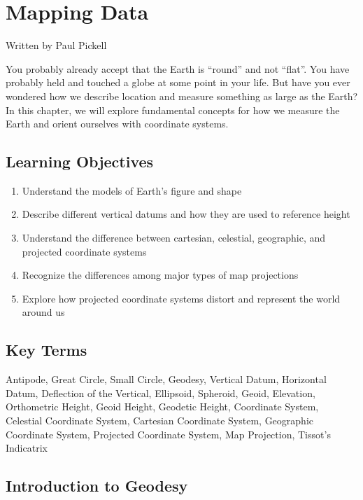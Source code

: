 \documentclass[
]{book}
\providecommand{\tightlist}{%
  \setlength{\itemsep}{0pt}\setlength{\parskip}{0pt}}
\begin{document}
\chapter{Mapping Data}\label{mapping-data}

Written by
Paul Pickell

You probably already accept that the Earth is ``round'' and not ``flat''. You have probably held and touched a globe at some point in your life. But have you ever wondered how we describe location and measure something as large as the Earth? In this chapter, we will explore fundamental concepts for how we measure the Earth and orient ourselves with coordinate systems.

\section*{Learning Objectives}\label{learning-objectives-1}

\begin{enumerate}
\def\labelenumi{\arabic{enumi}.}
\tightlist
\item
  Understand the models of Earth's figure and shape
\item
  Describe different vertical datums and how they are used to reference height
\item
  Understand the difference between cartesian, celestial, geographic, and projected coordinate systems
\item
  Recognize the differences among major types of map projections
\item
  Explore how projected coordinate systems distort and represent the world around us
\end{enumerate}

\section*{Key Terms}\label{key-terms-1}

Antipode, Great Circle, Small Circle, Geodesy, Vertical Datum, Horizontal Datum, Deflection of the Vertical, Ellipsoid, Spheroid, Geoid, Elevation, Orthometric Height, Geoid Height, Geodetic Height, Coordinate System, Celestial Coordinate System, Cartesian Coordinate System, Geographic Coordinate System, Projected Coordinate System, Map Projection, Tissot's Indicatrix

\section{Introduction to Geodesy}\label{introduction-to-geodesy}
\end{document}
